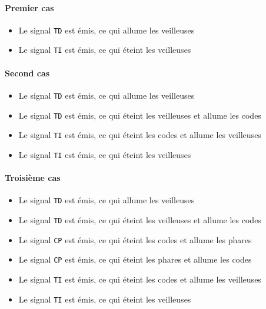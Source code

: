 \documentclass{article}
\begin{document}
      \paragraph{Premier cas}
        \begin{itemize}
          \item Le signal {\tt TD} est émis, ce qui allume les veilleuses
          \item Le signal {\tt TI} est émis, ce qui éteint les veilleuses
        \end{itemize}

      \paragraph{Second cas}
        \begin{itemize}
          \item Le signal {\tt TD} est émis, ce qui allume les veilleuses
          \item Le signal {\tt TD} est émis, ce qui éteint les veilleuses et
            allume les codes
          \item Le signal {\tt TI} est émis, ce qui éteint les codes et allume
            les veilleuses
          \item Le signal {\tt TI} est émis, ce qui éteint les veilleuses 
       \end{itemize}

      \paragraph{Troisième cas}
        \begin{itemize}
          \item Le signal {\tt TD} est émis, ce qui allume les veilleuses
          \item Le signal {\tt TD} est émis, ce qui éteint les veilleuses et
            allume les codes
          \item Le signal {\tt CP} est émis, ce qui éteint les codes et allume
            les phares 
          \item Le signal {\tt CP} est émis, ce qui éteint les phares et allume
            les codes 
          \item Le signal {\tt TI} est émis, ce qui éteint les codes et allume
            les veilleuses
          \item Le signal {\tt TI} est émis, ce qui éteint les veilleuses
        \end{itemize}
\end{document}
